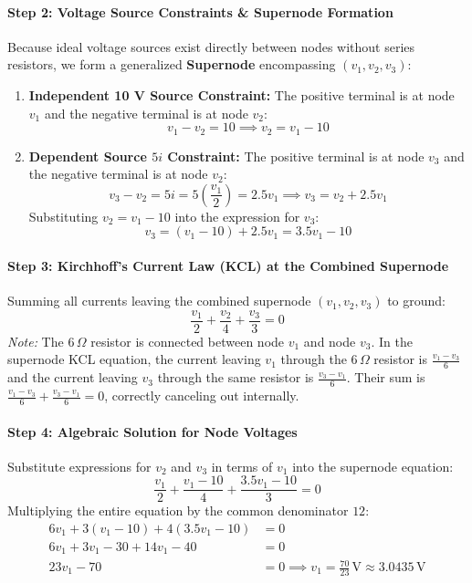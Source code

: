 \documentclass[11pt,a4paper,oneside]{article}
\begin{document}
\paragraph{Step 2: Voltage Source Constraints \& Supernode Formation}
Because ideal voltage sources exist directly between nodes without series resistors, we form a generalized \textbf{Supernode} encompassing $(v_1, v_2, v_3)$:
\begin{enumerate}[leftmargin=1.5em]
  \item \textbf{Independent 10 V Source Constraint:} The positive terminal is at node $v_1$ and the negative terminal is at node $v_2$:
  \begin{equation}
    v_1 - v_2 = 10 \implies v_2 = v_1 - 10
  \end{equation}
  \item \textbf{Dependent Source $5i$ Constraint:} The positive terminal is at node $v_3$ and the negative terminal is at node $v_2$:
  \begin{equation}
    v_3 - v_2 = 5i = 5\left(\frac{v_1}{2}\right) = 2.5 v_1 \implies v_3 = v_2 + 2.5 v_1
  \end{equation}
  Substituting $v_2 = v_1 - 10$ into the expression for $v_3$:
  \begin{equation}
    v_3 = (v_1 - 10) + 2.5 v_1 = 3.5 v_1 - 10
  \end{equation}
\end{enumerate}

\paragraph{Step 3: Kirchhoff's Current Law (KCL) at the Combined Supernode}
Summing all currents leaving the combined supernode $(v_1, v_2, v_3)$ to ground:
\begin{equation}
  \frac{v_1}{2} + \frac{v_2}{4} + \frac{v_3}{3} = 0
\end{equation}
\textit{Note:} The $6\,\Omega$ resistor is connected between node $v_1$ and node $v_3$. In the supernode KCL equation, the current leaving $v_1$ through the $6\,\Omega$ resistor is $\frac{v_1 - v_3}{6}$ and the current leaving $v_3$ through the same resistor is $\frac{v_3 - v_1}{6}$. Their sum is $\frac{v_1 - v_3}{6} + \frac{v_3 - v_1}{6} = 0$, correctly canceling out internally.

\paragraph{Step 4: Algebraic Solution for Node Voltages}
Substitute expressions for $v_2$ and $v_3$ in terms of $v_1$ into the supernode equation:
\begin{equation}
  \frac{v_1}{2} + \frac{v_1 - 10}{4} + \frac{3.5 v_1 - 10}{3} = 0
\end{equation}
Multiplying the entire equation by the common denominator $12$:
\begin{align*}
  6v_1 + 3(v_1 - 10) + 4(3.5 v_1 - 10) &= 0 \\
  6v_1 + 3v_1 - 30 + 14v_1 - 40 &= 0 \\
  23 v_1 - 70 &= 0 \implies v_1 = \frac{70}{23}\,\mathrm{V} \approx 3.0435\,\mathrm{V}
\end{align*}
\end{document}
